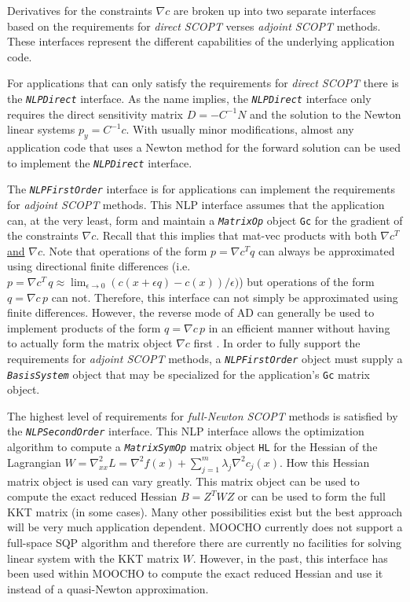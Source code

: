 \documentclass[pdf,12pt,report]{SANDreport}
\begin{document}
Derivatives for the constraints $\nabla c$ are broken up into two separate
interfaces based on the requirements for \textit{direct SCOPT} verses
{}\textit{adjoint SCOPT} methods.  These interfaces represent the different
capabilities of the underlying application code.

For applications that can only satisfy the requirements for {}\textit{direct
SCOPT} there is the {}\texttt{\textit{NLP\-Direct}} interface.  As the name
implies, the {}\texttt{\textit{NLP\-Direct}} interface only requires the
direct sensitivity matrix $D = -C^{-1} N$ and the solution to the Newton
linear systems $p_y = C^{-1} c$.  With usually minor modifications, almost any
application code that uses a Newton method for the forward solution can be
used to implement the {}\texttt{\textit{NLPDirect}} interface.

The {}\texttt{\textit{NLP\-First\-Order}} interface is for applications can
implement the requirements for \textit{adjoint SCOPT} methods.  This NLP
interface assumes that the application can, at the very least, form and
maintain a {}\texttt{\textit{Matrix\-Op}} object {}\texttt{Gc} for the
gradient of the constraints $\nabla c$.  Recall that this implies that mat-vec
products with both $\nabla c^T$ \underline{and} $\nabla c$.  Note that
operations of the form $p = \nabla c^T q$ can always be approximated using
directional finite differences (i.e.\ $p = \nabla c^T \, q \approx
\lim_{\epsilon \rightarrow 0} ( c(x+\epsilon q) - c(x) ) / \epsilon )$) but
operations of the form $q = \nabla c \, p$ can not.  Therefore, this interface
can not simply be approximated using finite differences.  However, the reverse
mode of AD can generally be used to implement products of the form $q = \nabla
c \, p$ in an efficient manner without having to actually form the matrix
object $\nabla c$ first {}\cite{ref:adolc_1996}.  In order to fully support
the requirements for {}\textit{adjoint SCOPT} methods, a
{}\texttt{\textit{NLP\-First\-Order}} object must supply a
{}\texttt{\textit{Basis\-System}} object that may be specialized for the
application's {}\texttt{Gc} matrix object.

The highest level of requirements for \textit{full-Newton SCOPT} methods is
satisfied by the {}\texttt{\textit{NLP\-Second\-Order}} interface.  This NLP
interface allows the optimization algorithm to compute a
{}\texttt{\textit{Matrix\-Sym\-Op}} matrix object {}\texttt{HL} for the
Hessian of the Lagrangian $W = \nabla^2_{xx} L = \nabla^2 f(x) + \sum^m_{j=1}
\lambda_j \nabla^2 c_j(x)$.  How this Hessian matrix object is used can vary
greatly.  This matrix object can be used to compute the exact reduced Hessian
$B = Z^T W Z$ or can be used to form the full KKT matrix (in some cases).
Many other possibilities exist but the best approach will be very much
application dependent.  MOOCHO currently does not support a full-space SQP
algorithm and therefore there are currently no facilities for solving linear
system with the KKT matrix $W$.  However, in the past, this interface has been
used within MOOCHO to compute the exact reduced Hessian and use it instead of
a quasi-Newton approximation.
\end{document}
